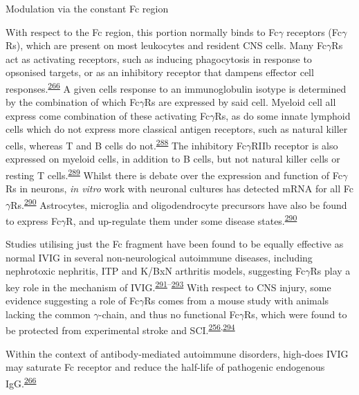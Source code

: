 \documentclass[
]{article}
\begin{document}
Modulation via the constant Fc region

With respect to the Fc region, this portion normally binds to Fc\(\gamma\) receptors (Fc\(\gamma\)Rs), which are present on most leukocytes and resident CNS cells.
Many Fc\(\gamma\)Rs act as activating receptors, such as inducing phagocytosis in response to opsonised targets, or as an inhibitory receptor that dampens effector cell responses.\textsuperscript{\protect\hyperlink{ref-schwab_intravenous_2013}{266}}
A given cells response to an immunoglobulin isotype is determined by the combination of which Fc\(\gamma\)Rs are expressed by said cell.
Myeloid cell all express come combination of these activating Fc\(\gamma\)Rs, as do some innate lymphoid cells which do not express more classical antigen receptors, such as natural killer cells, whereas T and B cells do not.\textsuperscript{\protect\hyperlink{ref-perussia_murine_1989}{288}}
The inhibitory Fc\(\gamma\)RIIb receptor is also expressed on myeloid cells, in addition to B cells, but not natural killer cells or resting T cells.\textsuperscript{\protect\hyperlink{ref-bruhns_mouse_2015}{289}}
Whilst there is debate over the expression and function of Fc\(\gamma\)Rs in neurons, \emph{in vitro} work with neuronal cultures has detected mRNA for all Fc\(\gamma\)Rs.\textsuperscript{\protect\hyperlink{ref-thom_therapeutic_2017}{290}}
Astrocytes, microglia and oligodendrocyte precursors have also be found to express Fc\(\gamma\)R, and up-regulate them under some disease states.\textsuperscript{\protect\hyperlink{ref-thom_therapeutic_2017}{290}}

Studies utilising just the Fc fragment have been found to be equally effective as normal IVIG in several non-neurological autoimmune diseases, including nephrotoxic nephritis, ITP and K/BxN arthritis models, suggesting Fc\(\gamma\)Rs play a key role in the mechanism of IVIG.\textsuperscript{\protect\hyperlink{ref-samuelsson_anti-inflammatory_2001}{291}--\protect\hyperlink{ref-kaneko_pathology_2006}{293}}
With respect to CNS injury, some evidence suggesting a role of Fc\(\gamma\)Rs comes from a mouse study with animals lacking the common \(\gamma\)-chain, and thus no functional Fc\(\gamma\)Rs, which were found to be protected from experimental stroke and SCI.\textsuperscript{\protect\hyperlink{ref-ankeny_b_2009}{256},\protect\hyperlink{ref-komine-kobayashi_dual_2004}{294}}

Within the context of antibody-mediated autoimmune disorders, high-does IVIG may saturate Fc receptor and reduce the half-life of pathogenic endogenous IgG.\textsuperscript{\protect\hyperlink{ref-schwab_intravenous_2013}{266}}
\end{document}
